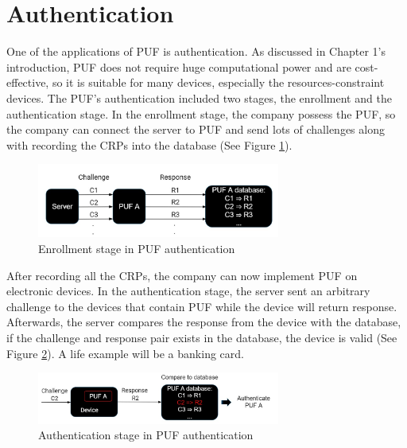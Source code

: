 \section{Authentication}
One of the applications of PUF is authentication. As discussed in Chapter 1's introduction, PUF does not require huge computational power and are cost-effective, so it is suitable for many devices,
especially the resources-constraint devices. The PUF's authentication included two stages, the enrollment and the authentication stage. In the enrollment stage, the company possess the PUF, so
the company can connect the server to PUF and send lots of challenges along with recording the CRPs into the database \cite{Reference2} (See Figure \ref{fig:figure4}).

\begin{figure}[htp]
    \centering
    \includegraphics[width=8cm]{figures/figure4.jpg}
    \caption{Enrollment stage in PUF authentication}
    \label{fig:figure4}
    \end{figure}

After recording all the CRPs, the company can now implement PUF on electronic devices.
In the authentication stage, the server sent an arbitrary challenge to the devices that contain PUF while the device will return response. Afterwards, the server compares the response from the device with the database, 
if the challenge and response pair exists in the database, the device is valid \cite{Reference2} (See Figure \ref{fig:figure5}). A life example will be a banking card.

\begin{figure}[htp]
    \centering
    \includegraphics[width=8cm]{figures/figure5.jpg}
    \caption{Authentication stage in PUF authentication}
    \label{fig:figure5}
    \end{figure}

